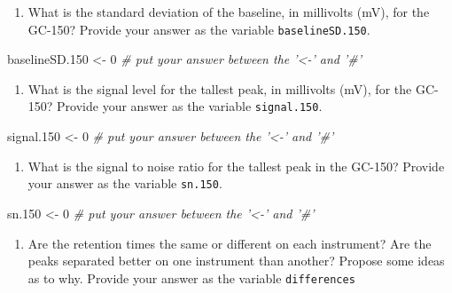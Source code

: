 \documentclass[]{tufte-book}
\newenvironment{Shaded}{}{}
\newcommand{\CommentTok}[1]{\textcolor[rgb]{0.38,0.63,0.69}{\textit{#1}}}
\newcommand{\DecValTok}[1]{\textcolor[rgb]{0.25,0.63,0.44}{#1}}
\newcommand{\FloatTok}[1]{\textcolor[rgb]{0.25,0.63,0.44}{#1}}
\newcommand{\NormalTok}[1]{#1}
\newcommand{\StringTok}[1]{\textcolor[rgb]{0.25,0.44,0.63}{#1}}
\providecommand{\tightlist}{%
  \setlength{\itemsep}{0pt}\setlength{\parskip}{0pt}}
\begin{document}
\begin{enumerate}
\def\labelenumi{\arabic{enumi}.}
\setcounter{enumi}{11}
\tightlist
\item
  What is the standard deviation of the baseline, in millivolts (mV), for the GC-150? Provide your answer as the variable \texttt{baselineSD.150}.
\end{enumerate}

\begin{Shaded}
\begin{Highlighting}[]
\NormalTok{baselineSD}\FloatTok{.150}\NormalTok{ <-}\StringTok{ }\DecValTok{0}    \CommentTok{# put your answer between the '<-' and '#'}
\end{Highlighting}
\end{Shaded}

\begin{enumerate}
\def\labelenumi{\arabic{enumi}.}
\setcounter{enumi}{12}
\tightlist
\item
  What is the signal level for the tallest peak, in millivolts (mV), for the GC-150? Provide your answer as the variable \texttt{signal.150}.
\end{enumerate}

\begin{Shaded}
\begin{Highlighting}[]
\NormalTok{signal}\FloatTok{.150}\NormalTok{ <-}\StringTok{ }\DecValTok{0}    \CommentTok{# put your answer between the '<-' and '#'}
\end{Highlighting}
\end{Shaded}

\begin{enumerate}
\def\labelenumi{\arabic{enumi}.}
\setcounter{enumi}{13}
\tightlist
\item
  What is the signal to noise ratio for the tallest peak in the GC-150? Provide your answer as the variable \texttt{sn.150}.
\end{enumerate}

\begin{Shaded}
\begin{Highlighting}[]
\NormalTok{sn}\FloatTok{.150}\NormalTok{ <-}\StringTok{ }\DecValTok{0}    \CommentTok{# put your answer between the '<-' and '#'}
\end{Highlighting}
\end{Shaded}

\begin{enumerate}
\def\labelenumi{\arabic{enumi}.}
\setcounter{enumi}{14}
\tightlist
\item
  Are the retention times the same or different on each instrument? Are the peaks separated better on one instrument than another? Propose some ideas as to why. Provide your answer as the variable \texttt{differences}
\end{enumerate}
\end{document}
